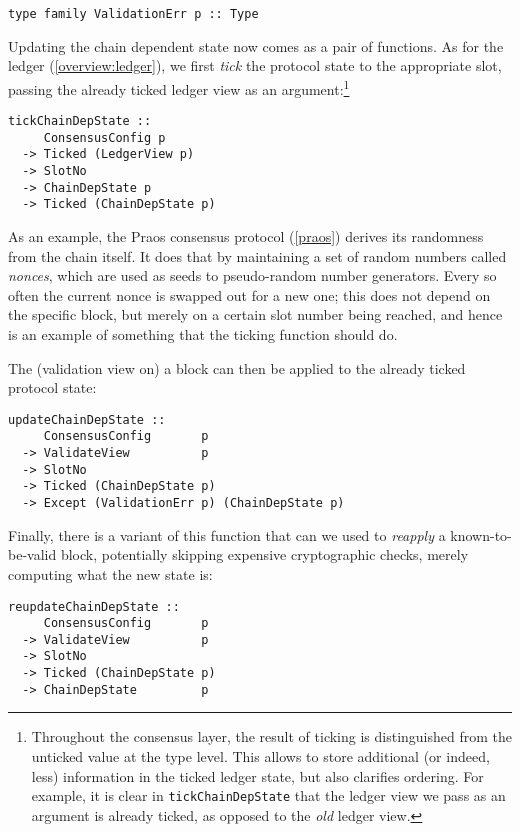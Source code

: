 \begin{lstlisting}
type family ValidationErr p :: Type
\end{lstlisting}

Updating the chain dependent state now comes as a pair of functions. As for the ledger
(\cref{overview:ledger}), we first \emph{tick} the protocol state to the
appropriate slot, passing the already ticked ledger view as an
argument:\footnote{Throughout the consensus layer, the result of ticking is
distinguished from the unticked value at the type level. This allows to store
additional (or indeed, less) information in the ticked ledger state, but also
clarifies ordering. For example, it is clear in \lstinline!tickChainDepState!
that the ledger view we pass as an argument is already ticked, as opposed to the
\emph{old} ledger view.}

\begin{lstlisting}
tickChainDepState ::
     ConsensusConfig p
  -> Ticked (LedgerView p)
  -> SlotNo
  -> ChainDepState p
  -> Ticked (ChainDepState p)
\end{lstlisting}

As an example, the Praos consensus protocol (\cref{praos}) derives its
randomness from the  chain itself. It does that by maintaining a set of random
numbers called \emph{nonces}, which are used as seeds to pseudo-random number
generators. Every so often the current nonce is swapped out for a new one; this
does not depend on the specific block, but merely on a certain slot number being
reached, and hence is an example of something that the ticking function should
do.

The (validation view on) a block can then be applied to the already ticked
protocol state:

\begin{lstlisting}
updateChainDepState ::
     ConsensusConfig       p
  -> ValidateView          p
  -> SlotNo
  -> Ticked (ChainDepState p)
  -> Except (ValidationErr p) (ChainDepState p)
\end{lstlisting}

Finally, there is a variant of this function that can we used to \emph{reapply}
a known-to-be-valid block, potentially skipping expensive cryptographic checks,
merely computing what the new state is:

\begin{lstlisting}
reupdateChainDepState ::
     ConsensusConfig       p
  -> ValidateView          p
  -> SlotNo
  -> Ticked (ChainDepState p)
  -> ChainDepState         p
\end{lstlisting}

